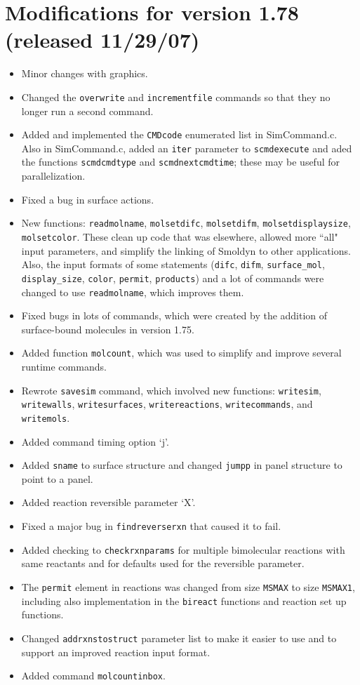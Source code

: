\documentclass {scrbook}
\newcommand {\ttt} {\texttt}
\begin{document}
\section{Modifications for version 1.78 (released 11/29/07)}
\begin{itemize}
\item Minor changes with graphics.
\item Changed the \ttt{overwrite} and \ttt{incrementfile} commands so that they no longer run a second command.
\item Added and implemented the \ttt{CMDcode} enumerated list in SimCommand.c. Also in SimCommand.c, added an \ttt{iter} parameter to \ttt{scmdexecute} and aded the functions \ttt{scmdcmdtype} and \ttt{scmdnextcmdtime}; these may be useful for parallelization.
\item Fixed a bug in surface actions.
\item New functions: \ttt{readmolname}, \ttt{molsetdifc}, \ttt{molsetdifm}, \ttt{molsetdisplaysize}, \ttt{molsetcolor}. These clean up code that was elsewhere, allowed more ``all" input parameters, and simplify the linking of Smoldyn to other applications. Also, the input formats of some statements (\ttt{difc}, \ttt{difm}, \ttt{surface\_mol}, \ttt{display\_size}, \ttt{color}, \ttt{permit}, \ttt{products}) and a lot of commands were changed to use \ttt{readmolname}, which improves them.
\item Fixed bugs in lots of commands, which were created by the addition of surface-bound molecules in version 1.75.
\item Added function \ttt{molcount}, which was used to simplify and improve several runtime commands.
\item Rewrote \ttt{savesim} command, which involved new functions: \ttt{writesim}, \ttt{writewalls}, \ttt{writesurfaces}, \ttt{writereactions}, \ttt{writecommands}, and \ttt{writemols}.
\item Added command timing option `j'.
\item Added \ttt{sname} to surface structure and changed \ttt{jumpp} in panel structure to point to a panel.
\item Added reaction reversible parameter `X'.
\item Fixed a major bug in \ttt{findreverserxn} that caused it to fail.
\item Added checking to \ttt{checkrxnparams} for multiple bimolecular reactions with same reactants and for defaults used for the reversible parameter.
\item The \ttt{permit} element in reactions was changed from size \ttt{MSMAX} to size \ttt{MSMAX1}, including also implementation in the \ttt{bireact} functions and reaction set up functions.
\item Changed \ttt{addrxnstostruct} parameter list to make it easier to use and to support an improved reaction input format.
\item Added command \ttt{molcountinbox}.
\end{itemize}
\end{document}
